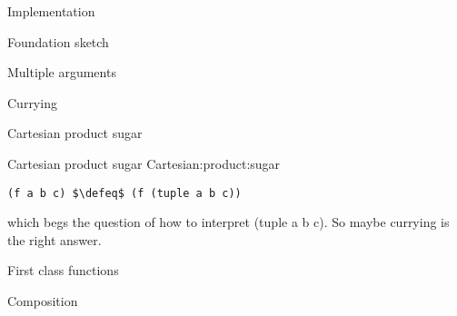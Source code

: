 \documentclass[12pt]{PalisadesLakesBook}
\begin{document}
\begin{plSection}{Implementation}
\begin{plSection}{Foundation sketch}
\begin{plSection}{Multiple arguments}
\begin{plSection}{Currying}
\end{plSection}%
\begin{plSection}{Cartesian product sugar}

\begin{plListing}
{Cartesian product sugar}
{Cartesian:product:sugar}
\begin{lstlisting}[language=pseudocode]
(f a b c) $\defeq$ (f (tuple a b c))
\end{lstlisting}
\end{plListing}
which begs the question of how to interpret
{\pseudocodeFont (tuple a b c)}.
So maybe currying is the right answer.

\end{plSection}%
\end{plSection}%
\end{plSection}%
\begin{plSection}{First class functions} 
\begin{plSection}{Composition}\label{sec:Compose}

\end{plSection}%
\end{plSection}%
\end{plSection}%
\end{document}
